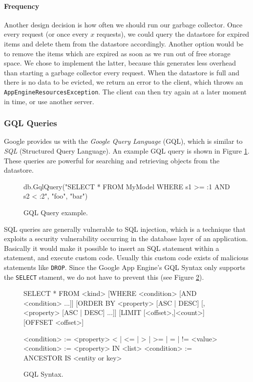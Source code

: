 \paragraph{Frequency}
Another design decision is how often we should run our garbage collector. Once
every request (or once every $x$ requests), we could query the datastore for
expired items and delete them from the datastore accordingly. Another option
would be to remove the items which are expired as soon as we run out of free
storage space. We chose to implement the latter, because this generates less
overhead than starting a garbage collector every request. When the datastore is full and
there is no data to be evicted, we return an error to the client, which throws an
\texttt{AppEngineResourcesException}. The client can then try again at a later
moment in time, or use another server.

\subsubsection{GQL Queries}
\label{serverdesign-gql}
Google provides us with the \emph{Google Query Language} (GQL), which is similar
to \emph{SQL} (Structured Query Language). An example GQL query is shown in
Figure \ref{serverdesign-gql-example}. These queries are powerful for searching and
retrieving objects from the datastore. 

\begin{figure}[ht] %
\begin{center}
\begin{code}
db.GqlQuery("SELECT * FROM MyModel WHERE s1 >= :1 AND s2 < :2", "foo", "bar")
\end{code}
\caption{GQL Query example.\label{serverdesign-gql-example}}
\end{center}
\end{figure}

SQL queries are generally vulnerable to SQL injection,
which is a technique that exploits a security vulnerability occurring in the
database layer of an application. Basically it would make it possible to insert
an SQL statement within a statement, and execute custom code. Usually this
custom code exists of malicious statements like \texttt{DROP}. Since the Google
App Engine's GQL Syntax only supports the \texttt{SELECT} stament, we do not
have to prevent this (see Figure \ref{serverdesign-gql-syntax}).

\begin{figure}[ht] %
\begin{center}
\begin{code}
  SELECT * FROM <kind>
    [WHERE <condition> [AND <condition> ...]]
    [ORDER BY <property> [ASC | DESC] [, <property> [ASC | DESC] ...]]
    [LIMIT [<offset>,]<count>]
    [OFFSET <offset>]

  <condition> := <property> {< | <= | > | >= | = | != } <value>
  <condition> := <property> IN <list>
  <condition> := ANCESTOR IS <entity or key>
\end{code}
\caption{GQL Syntax.\label{serverdesign-gql-syntax}}
\end{center}
\end{figure}

